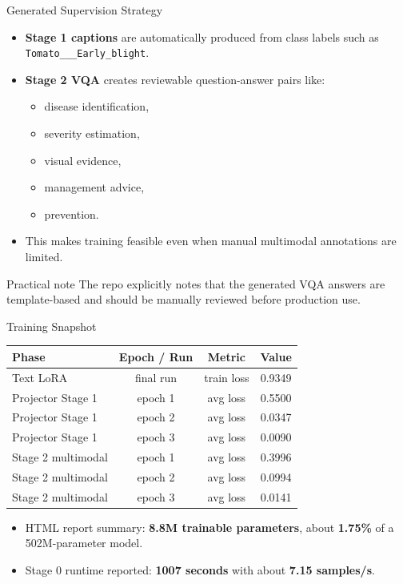 \documentclass[aspectratio=169,11pt]{beamer}
\begin{document}
\begin{frame}{Generated Supervision Strategy}
\begin{itemize}
    \item \textbf{Stage 1 captions} are automatically produced from class labels such as \texttt{Tomato\_\_\_Early\_blight}.
    \item \textbf{Stage 2 VQA} creates reviewable question-answer pairs like:
    \begin{itemize}
        \item disease identification,
        \item severity estimation,
        \item visual evidence,
        \item management advice,
        \item prevention.
    \end{itemize}
    \item This makes training feasible even when manual multimodal annotations are limited.
\end{itemize}
\vspace{0.4em}
\begin{block}{Practical note}
The repo explicitly notes that the generated VQA answers are template-based and should be manually reviewed before production use.
\end{block}
\end{frame}

\begin{frame}{Training Snapshot}
\small
\begin{center}
\begin{tabularx}{\linewidth}{lccc}
\toprule
\textbf{Phase} & \textbf{Epoch / Run} & \textbf{Metric} & \textbf{Value} \\
\midrule
Text LoRA & final run & train loss & 0.9349 \\
Projector Stage 1 & epoch 1 & avg loss & 0.5500 \\
Projector Stage 1 & epoch 2 & avg loss & 0.0347 \\
Projector Stage 1 & epoch 3 & avg loss & 0.0090 \\
Stage 2 multimodal & epoch 1 & avg loss & 0.3996 \\
Stage 2 multimodal & epoch 2 & avg loss & 0.0994 \\
Stage 2 multimodal & epoch 3 & avg loss & 0.0141 \\
\bottomrule
\end{tabularx}
\end{center}
\vspace{0.4em}
\begin{itemize}
    \item HTML report summary: \textbf{8.8M trainable parameters}, about \textbf{1.75\%} of a 502M-parameter model.
    \item Stage 0 runtime reported: \textbf{1007 seconds} with about \textbf{7.15 samples/s}.
\end{itemize}
\end{frame}
\end{document}
